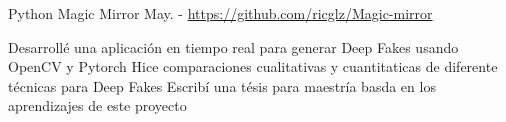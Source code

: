 \begin{cventries}
  \cventry
    {Python}
    {Magic Mirror} %
    {May. - } %
    {\url{https://github.com/ricglz/Magic-mirror}} %
    {
      \begin{cvitems} %
         {{
          Desarrollé una aplicación en tiempo real para generar Deep Fakes usando OpenCV y Pytorch
        }}
         {{
          Hice comparaciones cualitativas y cuantitaticas de diferente técnicas para Deep Fakes
        }}
         {{
          Escribí una tésis para maestría basda en los aprendizajes de este proyecto
        }}
      \end{cvitems}
    }



\end{cventries}
